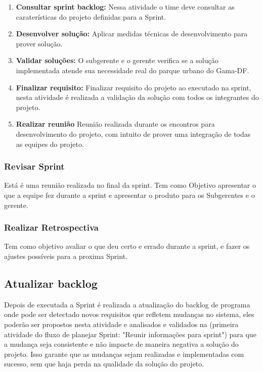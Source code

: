 \begin{enumerate}
	\item \textbf{Consultar sprint backlog:}
	Nessa atividade o time deve consultar as caraterísticas do projeto definidas para a Sprint.
	\item \textbf{Desenvolver solução:}
	Aplicar medidas técnicas de desenvolvimento para prover solução.
	\item \textbf{Validar soluções:}
	O subgerente e o gerente verifica se a solução implementada atende sua necessidade real do parque urbano do Gama-DF. 
	\item \textbf{Finalizar requisito:}
	Finalizar requisito do projeto ao executado na sprint, nesta atividade é realizada a validação da solução com todos os integrantes do projeto. 
	\item \textbf{Realizar reunião}
	Reunião realizada durante os encontros para desenvolvimento do projeto, com intuito de prover uma integração de todas as equipes do projeto. 
\end{enumerate}

\subsubsection{Revisar Sprint}

Está é uma reunião realizada no final da sprint. Tem como Objetivo apresentar o que  a equipe fez durante a sprint e apresentar o produto para os Subgerentes e o gerente. 

\subsubsection{Realizar Retrospectiva}
Tem como objetivo avaliar o que deu certo e errado durante a sprint, e fazer os ajustes possíveis  para a proxima Sprint.

\subsection{Atualizar backlog}
Depois de executada a Sprint é realizada a atualização do backlog de programa onde pode ser detectado novos requisitos que refletem mudanças no sistema, eles poderão ser propostos nesta atividade e analisados e validados na (primeira atividade do fluxo de planejar Sprint: "Reunir informações para sprint") para que a mudança seja consistente e não impacte de maneira negativa a solução do projeto. Isso garante que as mudanças sejam realizadas e implementadas com sucesso, sem que haja perda na qualidade da solução do projeto.

